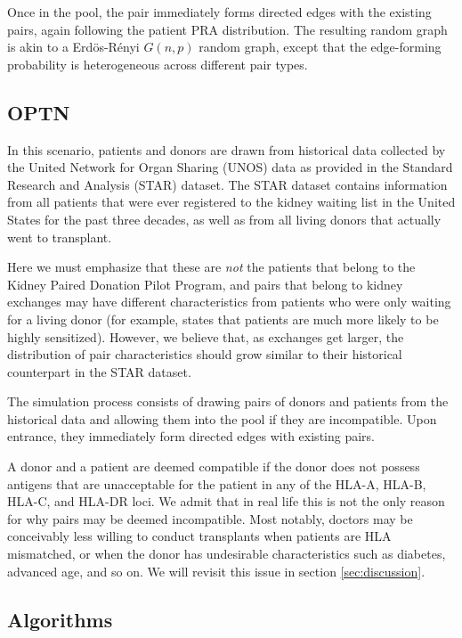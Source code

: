 \documentclass[12pt]{article}
\begin{document}
Once in the pool, the pair immediately forms directed edges with the existing pairs, again following the patient PRA distribution. The resulting random graph is akin to a Erd\"{o}s-R\'{e}nyi $G(n,p)$ random graph, except that the edge-forming probability is heterogeneous across different pair types.

\subsection{OPTN}

In this scenario, patients and donors are drawn from historical data collected by the United Network for Organ Sharing (UNOS) data as provided in the Standard Research and Analysis (STAR) dataset. The STAR dataset contains information from all patients that were ever registered to the kidney waiting list in the United States for the past three decades, as well as from all living donors that actually went to transplant. 

Here we must emphasize that these are \emph{not} the patients that belong to the Kidney Paired Donation Pilot Program, and pairs that belong to kidney exchanges may have different characteristics from patients who were only waiting for a living donor (for example, \cite{ashlagi2013kidney} states that patients are much more likely to be highly sensitized). However, we believe that, as exchanges get larger, the distribution of pair characteristics should grow similar to their historical counterpart in the STAR dataset. 

The simulation process consists of drawing pairs of donors and patients from the historical data and allowing them into the pool if they are incompatible. Upon entrance, they immediately form directed edges with existing pairs.

A donor and a patient are deemed compatible if the donor does not possess antigens that are unacceptable for the patient in any of the HLA-A, HLA-B, HLA-C, and HLA-DR loci. We admit that in real life this is not the only reason for why pairs may be deemed incompatible. Most notably, doctors may be conceivably less willing to conduct transplants when patients are HLA mismatched, or when the donor has undesirable characteristics such as diabetes, advanced age, and so on. We will revisit this issue in section \ref{sec:discussion}.


\subsection{Algorithms}
\end{document}
